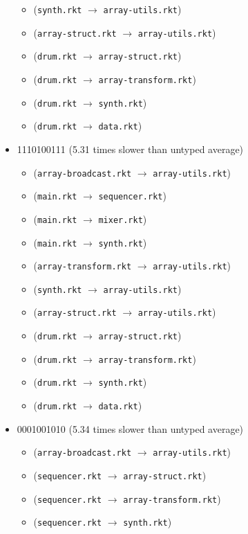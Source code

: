 \documentclass{article}
\newcommand{\mono}[1]{\texttt{#1}}
\begin{document}
\begin{itemize}
\begin{itemize}
  \item (\mono{synth.rkt} $\rightarrow$ \mono{array-utils.rkt})
  \item (\mono{array-struct.rkt} $\rightarrow$ \mono{array-utils.rkt})
  \item (\mono{drum.rkt} $\rightarrow$ \mono{array-struct.rkt})
  \item (\mono{drum.rkt} $\rightarrow$ \mono{array-transform.rkt})
  \item (\mono{drum.rkt} $\rightarrow$ \mono{synth.rkt})
  \item (\mono{drum.rkt} $\rightarrow$ \mono{data.rkt})
  \end{itemize}
\item 1110100111 (5.31 times slower than untyped average)
  \begin{itemize}
  \item (\mono{array-broadcast.rkt} $\rightarrow$ \mono{array-utils.rkt})
  \item (\mono{main.rkt} $\rightarrow$ \mono{sequencer.rkt})
  \item (\mono{main.rkt} $\rightarrow$ \mono{mixer.rkt})
  \item (\mono{main.rkt} $\rightarrow$ \mono{synth.rkt})
  \item (\mono{array-transform.rkt} $\rightarrow$ \mono{array-utils.rkt})
  \item (\mono{synth.rkt} $\rightarrow$ \mono{array-utils.rkt})
  \item (\mono{array-struct.rkt} $\rightarrow$ \mono{array-utils.rkt})
  \item (\mono{drum.rkt} $\rightarrow$ \mono{array-struct.rkt})
  \item (\mono{drum.rkt} $\rightarrow$ \mono{array-transform.rkt})
  \item (\mono{drum.rkt} $\rightarrow$ \mono{synth.rkt})
  \item (\mono{drum.rkt} $\rightarrow$ \mono{data.rkt})
  \end{itemize}
\item 0001001010 (5.34 times slower than untyped average)
  \begin{itemize}
  \item (\mono{array-broadcast.rkt} $\rightarrow$ \mono{array-utils.rkt})
  \item (\mono{sequencer.rkt} $\rightarrow$ \mono{array-struct.rkt})
  \item (\mono{sequencer.rkt} $\rightarrow$ \mono{array-transform.rkt})
  \item (\mono{sequencer.rkt} $\rightarrow$ \mono{synth.rkt})

\end{itemize}
\end{itemize}
\end{document}
